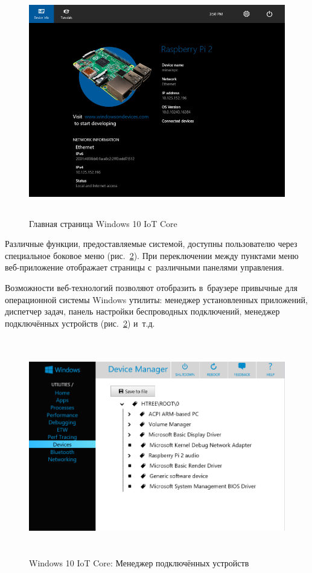 \begin{figure}[h!]
  \centering
  \includegraphics[height=10cm]{img/win10-device-info}
  \vspace*{12pt}
  \caption{Главная страница Windows 10 IoT Core}\label{fig:win10-device-info}
\end{figure}

Различные функции, предоставляемые системой, доступны пользователю через специальное боковое меню (рис.~\ref{fig:win10-settings}). При переключении между пунктами меню веб-приложение отображает страницы с~различными панелями управления.

Возможности веб-технологий позволяют отобразить в~браузере привычные для операционной системы Windows утилиты: менеджер установленных приложений, диспетчер задач, панель настройки беспроводных подключений, менеджер подключённых устройств (рис.~\ref{fig:win10-settings}) и~т.д.

\begin{figure}[h!]
  \centering
  \includegraphics[height=9.5cm]{img/win10-settings}
  \vspace*{12pt}
  \caption{Windows 10 IoT Core: Менеджер подключённых устройств}\label{fig:win10-settings}
\end{figure}

